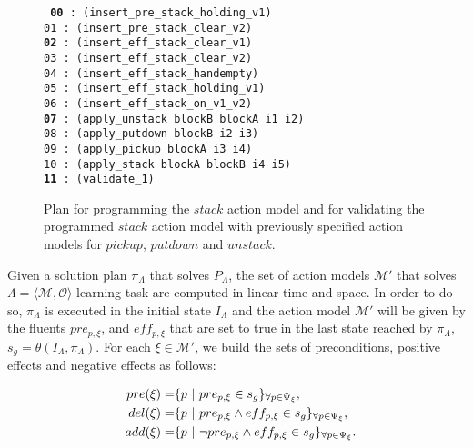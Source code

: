 \documentclass[runningheads]{llncs}
\newcommand{\tup}[1]{{\langle #1 \rangle}}
\begin{document}
\begin{figure}[hbt!]
	{\footnotesize\tt
		{\bf 00} : (insert\_pre\_stack\_holding\_v1) \\
		01 : (insert\_pre\_stack\_clear\_v2)\\
		{\bf 02} : (insert\_eff\_stack\_clear\_v1)\\
		03 : (insert\_eff\_stack\_clear\_v2)\\
		04 : (insert\_eff\_stack\_handempty)\\
		05 : (insert\_eff\_stack\_holding\_v1)\\
		06 : (insert\_eff\_stack\_on\_v1\_v2)\\
		{\bf 07} : (apply\_unstack blockB blockA i1 i2)\\
		08 : (apply\_putdown blockB i2 i3)\\
		09 : (apply\_pickup blockA i3 i4)\\
		10 : (apply\_stack blockA blockB i4 i5)\\
		{\bf 11} : (validate\_1)
	}
	\caption{\small Plan for programming the $stack$ action model and for validating the programmed $stack$ action model with previously specified action models for $pickup$, $putdown$ and $unstack$.}
	\label{fig:plan-lplan}
\end{figure}

Given a solution plan $\pi_\Lambda$ that solves $P_{\Lambda}$, the set of action models $\mathcal{M}'$ that solves $\Lambda=\tup{\mathcal{M},\mathcal{O}}$ learning task are computed in linear time and space. In order to do so, $\pi_\Lambda$ is executed in the initial state $I_{\Lambda}$ and the action model $\mathcal{M}'$ will be given by the fluents $pre_{p,\xi}$, and $eff_{p,\xi}$ that are set to true in the last state reached by $\pi_\Lambda$, $s_g=\theta(I_\Lambda,\pi_\Lambda)$. For each $\xi \in \mathcal{M'}$, we build the sets of preconditions, positive effects and negative effects as follows:

\begin{small}
	\begin{align*}
	  \hspace*{7pt}pre(\xi)=& \{p ~|~ pre_{p,\xi} \in s_g\}_{\forall p \in \Psi_\xi},\\
	  \hspace*{7pt}del(\xi)=& \{p ~|~ pre_{p,\xi} \wedge eff_{p,\xi} \in s_g\}_{\forall p \in \Psi_\xi},\\
	  \hspace*{7pt}add(\xi)=& \{p ~|~ \neg pre_{p,\xi} \wedge eff_{p,\xi} \in s_g\}_{\forall p \in \Psi_\xi}.          
	\end{align*}
\end{small}
\end{document}
